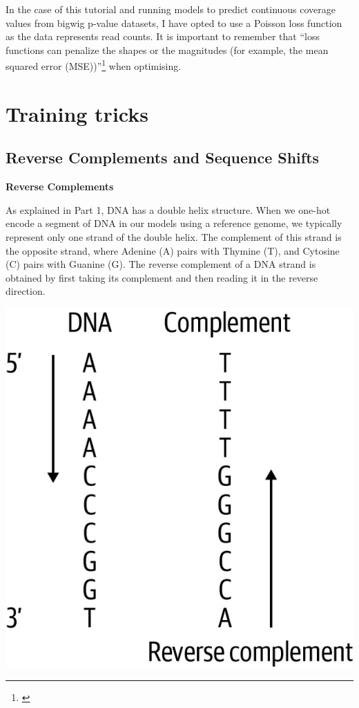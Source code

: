 \documentclass[
]{book}
\begin{document}
In the case of this tutorial and running models to predict continuous coverage values from bigwig p-value datasets, I have opted to use a Poisson loss function as the data represents read counts. It is important to remember that ``loss functions can penalize the shapes or the magnitudes (for example, the mean squared error (MSE))''\footnote{\citet{toneyan2022}} when optimising.

\chapter{Training tricks}\label{training-tricks}

\section{Reverse Complements and Sequence Shifts}\label{reverse-complements-and-sequence-shifts}

\textbf{Reverse Complements}

As explained in Part 1, DNA has a double helix structure. When we one-hot encode a segment of DNA in our models using a reference genome, we typically represent only one strand of the double helix. The complement of this strand is the opposite strand, where Adenine (A) pairs with Thymine (T), and Cytosine (C) pairs with Guanine (G). The reverse complement of a DNA strand is obtained by first taking its complement and then reading it in the reverse direction.

\includegraphics{images/reverse_complement.png}
\end{document}
